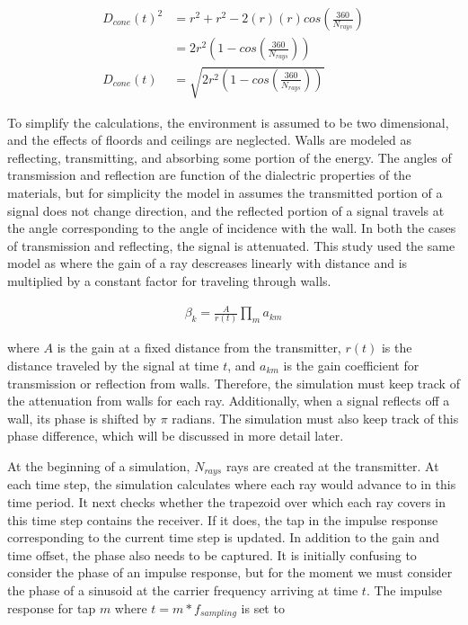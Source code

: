 \documentclass[article,11pt,onecolumn,final]{IEEEtran}
\begin{document}
\begin{align*}
D_{cone}(t)^2 &= r^2 + r^2 - 2(r)(r)cos(\frac{360}{N_{rays}}) \\
              &= 2r^2(1 - cos(\frac{360}{N_{rays}})) \\
D_{cone}(t) &= \sqrt{2r^2(1 - cos(\frac{360}{N_{rays}}))}
\end{align*}

To simplify the calculations, the environment is assumed to be two dimensional, and the effects of floords and ceilings are neglected. Walls are modeled as reflecting, transmitting, and absorbing some portion of the energy. The angles of transmission and reflection are function of the dialectric properties of the materials, but for simplicity the model in \cite{Holt} assumes the transmitted portion of a signal does not change direction, and the reflected portion of a signal travels at the angle corresponding to the angle of incidence with the wall. In both the cases of transmission and reflecting, the signal is attenuated. This study used the same model as \cite{Holt} where the gain of a ray descreases linearly with distance and is multiplied by a constant factor for traveling through walls.

\begin{align*}
 \beta_k = \frac{A}{r(t)} \prod_m a_{km} 
\end{align*}

where $A$ is the gain at a fixed distance from the transmitter, $r(t)$ is the distance traveled by the signal at time $t$, and $a_{km}$ is the gain coefficient for transmission or reflection from walls. Therefore, the simulation must keep track of the attenuation from walls for each ray. Additionally, when a signal reflects off a wall, its phase is shifted by $\pi$ radians. The simulation must also keep track of this phase difference, which will be discussed in more detail later.

At the beginning of a simulation, $N_{rays}$ rays are created at the transmitter. At each time step, the simulation calculates where each ray would advance to in this time period. It next checks whether the trapezoid over which each ray covers in this time step contains the receiver. If it does, the tap in the impulse response corresponding to the current time step is updated. In addition to the gain and time offset, the phase also needs to be captured. It is initially confusing to consider the phase of an impulse response, but for the moment we must consider the phase of a sinusoid at the carrier frequency arriving at time $t$. The impulse response for tap $m$ where $t=m*f_{sampling}$ is set to 
\end{document}
